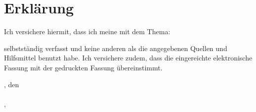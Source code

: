 
\chapter*{Erklärung}
	Ich versichere hiermit, dass ich meine \arbeit{} mit dem Thema:
	\begin{quote}
		\textit{\titel}
	\end{quote}
	selbstständig verfasst und keine anderen als die angegebenen Quellen und Hilfsmittel benutzt habe. Ich versichere zudem, dass die eingereichte elektronische Fassung mit der gedruckten Fassung übereinstimmt. 
	\vspace{1cm}
	
	\abgabeOrt, den \abgabeDatum \\[0.5cm]
	{\makebox[6cm]{\hrulefill}}\\ 
	\nachname , \vorname